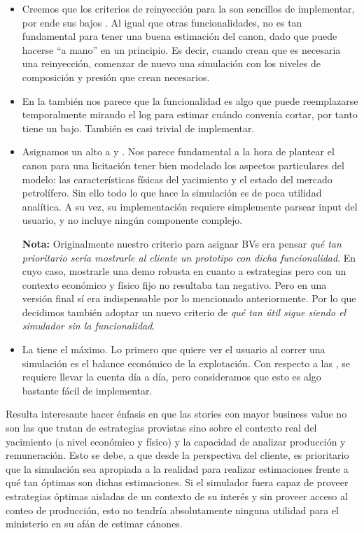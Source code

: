 \begin{itemize}
    \item Creemos que los criterios de reinyección para la  son sencillos 
    de implementar, por ende sus bajos \SP. Al igual que otras funcionalidades, 
    no es tan fundamental para tener una buena estimación del canon, 
    dado que puede hacerse ``a mano'' en un principio. Es decir, cuando crean que es necesaria una reinyección, comenzar de nuevo una simulación con los niveles de composición y presión que crean necesarios.
    
    \item En la  también nos parece que la funcionalidad es algo que puede reemplazarse temporalmente mirando el log para estimar cuándo convenía cortar, por tanto tiene un \BV{} bajo. También es casi trivial de implementar. 
    
    \item Asignamos un alto \BV{} a  y . Nos parece fundamental a la hora de plantear el canon para una licitación tener bien modelado los aspectos particulares del modelo: las características físicas del yacimiento y el estado del mercado petrolífero. Sin ello todo lo que hace la simulación es de poca utilidad analítica. A su vez, su implementación requiere simplemente parsear input del usuario, y no incluye ningún componente complejo.
    
    \textbf{Nota:} Originalmente nuestro criterio para asignar BVs era pensar \emph{qué tan prioritario sería mostrarle al cliente un prototipo con dicha funcionalidad}. En cuyo caso, mostrarle una demo robusta en cuanto a estrategias pero con un contexto económico y físico fijo no resultaba tan negativo. Pero en una versión final sí era indispensable por lo mencionado anteriormente. Por lo que decidimos también adoptar un nuevo criterio de \emph{qué tan útil sigue siendo el simulador sin la funcionalidad}.
    
    \item La  tiene el \BV{} máximo. Lo primero que quiere ver el usuario al correr una simulación es el balance económico de la explotación. Con respecto a las \SP{}, se requiere llevar la cuenta día a día, pero consideramos que esto es algo bastante fácil de implementar. 
\end{itemize}

Resulta interesante hacer énfasis en que las stories con mayor business value no son las que tratan de estrategias provistas sino sobre el contexto real del yacimiento (a nivel económico y físico) y la capacidad de analizar producción y remuneración. Esto se debe, a que desde la perspectiva del cliente, es prioritario que la simulación sea apropiada a la realidad para realizar estimaciones frente a qué tan óptimas son dichas estimaciones. Si el simulador fuera capaz de proveer estrategias óptimas aisladas de un contexto de su interés y sin proveer acceso al conteo de producción, esto no tendría absolutamente ninguna utilidad para el ministerio en su afán de estimar cánones.


